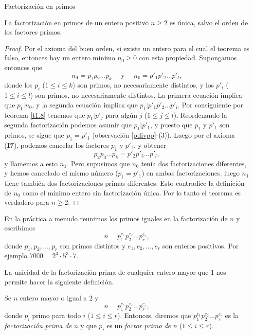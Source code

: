 \begin{section}{Factorización en primos}
\begin{teorema}\label{t1.8.2} La factorización en primos de un entero positivo $n\ge 2$ es única, salvo el orden de los factores primos.
\end{teorema}
\begin{proof} Por el axioma del buen orden, si existe un entero para el cual el teorema es falso, entonces hay un entero mínimo $n_0\ge 0$ con esta propiedad. Supongamos entonces que 
$$
n_0= p_1p_2\ldots p_k\quad\text{ y }\quad n_0= p'_1p'_2\ldots p'_l,
$$
donde los $p_i$ ($1\le i \le k$) son primos, no necesariamente distintos, y los $p'_i$ ($1\le i \le l$) son primos, no necesariamente distintos. La primera ecuación implica que $p_1|n_0$, y la segunda ecuación implica que $p_1 | p'_1p'_2\ldots p'_l$. Por consiguiente por teorema \ref{t1.8} tenemos que $p_1|p'_j$ para algún $j$ ($1\le j \le l$). Reordenando la segunda factorización podemos asumir que $p_1 | p'_1$, y puesto que $p_1$ y $p'_1$ son primos, se sigue que $p_1=p'_1$ (observación \ref{pdivpp}-(3)). Luego por el axioma (\textbf{I7}), podemos cancelar los factores $p_1$ y $p'_1$, y obtener
$$
p_2p_3 \ldots p_k = p'_2p'_3 \ldots p'_l,
$$
y llamemos a esto $n_1$. Pero supusimos que $n_0$ tenía dos factorizaciones diferentes, y hemos cancelado el mismo número ($p_1=p'_1$) en ambas factorizaciones, luego $n_1$ tiene también dos factorizaciones primas diferentes. Esto contradice la definición de $n_0$ como el mínimo entero sin factorización única. Por lo tanto el teorema es verdadero para $n\ge 2$.
\end{proof}

En la práctica a menudo reunimos los primos iguales en la factorización de $n$ y escribimos
\begin{equation*}
n=p_1^{e_1}p_2^{e_2}\ldots p_r^{e_r},
\end{equation*}
donde $p_1,p_2,\ldots ,p_r$ son primos distintos y $e_1,e_2,\ldots,e_r$ son enteros positivos. Por ejemplo $ 7000 = 2^3 \cdot 5^3 \cdot 7$.

La unicidad de la factorización prima de cualquier entero mayor que 1 nos permite hacer la siguiente definición. 

\begin{definicion}
    Se $n$  entero mayor o igual a $2$ y 
    \begin{equation*}
        n=p_1^{e_1}p_2^{e_2}\ldots p_r^{e_r},
    \end{equation*}
    donde $p_i$ primo para todo $i$ ($1\le i \le r$). Entonces, diremos que  $p_1^{e_1}p_2^{e_2}\ldots p_r^{e_r}$ es la \textit{factorización prima de $n$} y que $p_i$ es un \textit{factor primo de } $n$  ($1\le i \le r$).
\end{definicion}



\end{section}
